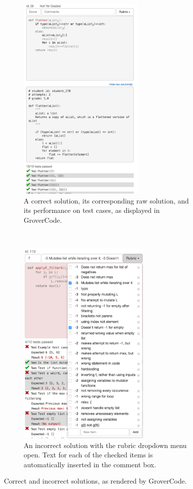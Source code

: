 \begin{figure}[t!]
    \centering
    \begin{subfigure}[b]{0.5\textwidth}
        \centering
        \includegraphics[height=4in]{Body/figures/grovercode/figure_2}
        \caption{A correct solution, its corresponding raw solution, and its performance on test cases, as displayed in GroverCode.}
        \label{fig:correct_stack}
    \end{subfigure}%
    ~ 
    \begin{subfigure}[b]{0.5\textwidth}
        \centering
        \includegraphics[height=4in]{Body/figures/grovercode/figure_3}
        \caption{An incorrect solution with the rubric dropdown menu open. Text for each of the checked items is automatically inserted in the comment box.}
        \label{fig:rubric}
    \end{subfigure}
    \caption{Correct and incorrect solutions, as rendered by GroverCode.}
\label{fig:correct_and_incorrect_stacks}
\end{figure}


